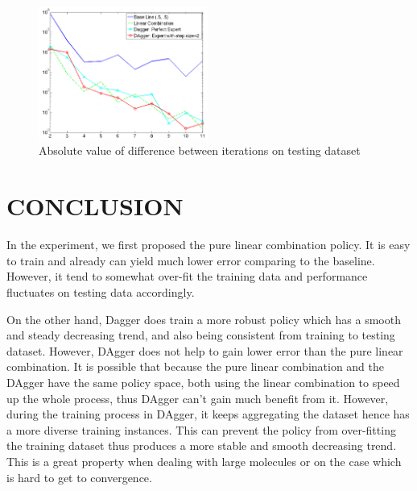 \documentclass[twoside]{article}
\begin{document}
\begin{figure}[h!]

  \caption{Absolute value of difference between iterations on testing dataset}
  \label{fig:converge_testing}
    \includegraphics[width=210px]{convergence_Testing.jpg}
\end{figure}


\section{CONCLUSION}
In the experiment, we first proposed the pure linear combination policy. It is easy to train and already can yield much lower error comparing to the baseline. However, it tend to somewhat over-fit the training data and performance fluctuates on testing data accordingly. 

On the other hand, Dagger does train a more robust policy which has a smooth and steady decreasing trend, and also being consistent from training to testing dataset. However, DAgger does not help to gain lower error than the pure linear combination. It is possible that because the pure linear combination and the DAgger have the same policy space, both using the linear combination to speed up the whole process, thus DAgger can't gain much benefit from it. However, during the training process in DAgger, it keeps aggregating the dataset hence has a more diverse training instances. This can prevent the policy from over-fitting the training dataset thus produces a more stable and smooth decreasing trend. This is a great property when dealing with large molecules or on the case which is hard to get to convergence.
\end{document}
